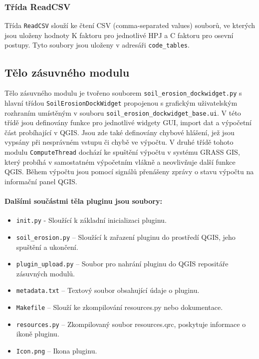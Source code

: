 \subsubsection{Třída ReadCSV} Třída \texttt{ReadCSV} slouží ke čtení
CSV (comma-separated values) souborů, ve kterých jsou uloženy hodnoty
K faktoru pro jednotlivé HPJ a C faktoru pro osevní postupy. Tyto
soubory jsou uloženy v adresáři \texttt{code\_tables}.

\subsection{Tělo zásuvného modulu} Tělo zásuvného modulu je tvořeno
souborem \texttt{soil\_erosion\_dockwidget.py} s hlavní třídou
\texttt{SoilErosionDockWidget} propojenou s grafickým uživatelským
rozhraním umístěným v souboru
\texttt{soil\_erosion\_dockwidget\_base.ui}. V této třídě jsou
definovány funkce pro jednotlivé widgety GUI, import dat a výpočetní
část probíhající v QGIS. Jsou zde také definovány chybové hlášení, jež
jsou vypsány při nesprávném vstupu či chybě ve výpočtu. V druhé třídě
tohoto modulu \texttt{ComputeThread} dochází ke spuštění výpočtu v
systému GRASS GIS, který probíhá v samostatném výpočetním vlákně a
neovlivňuje další funkce QGIS. Během výpočtu jsou pomocí signálů
přenášeny zprávy o stavu výpočtu na informační panel QGIS.

\paragraph{Dalšími součástmi těla pluginu jsou soubory:}
\begin{itemize}
	\item \texttt{init.py} - Sloužící k základní inicializaci
pluginu.
	\item \texttt{soil\_erosion.py} – Sloužící k zařazení pluginu
do prostředí QGIS, jeho spuštění a ukončení.
	\item \texttt{plugin\_upload.py} – Soubor pro nahrání pluginu
do QGIS repositáře zásuvných modulů.
	\item \texttt{metadata.txt} – Textový soubor obsahující údaje
o pluginu.
	\item \texttt{Makefile} – Slouží ke zkompilování resources.py
nebo dokumentace.
	\item \texttt{resources.py} – Zkompilovaný soubor
resources.qrc, poskytuje informace o ikoně pluginu.
	\item \texttt{Icon.png} – Ikona pluginu.
\end{itemize}
\newpage
